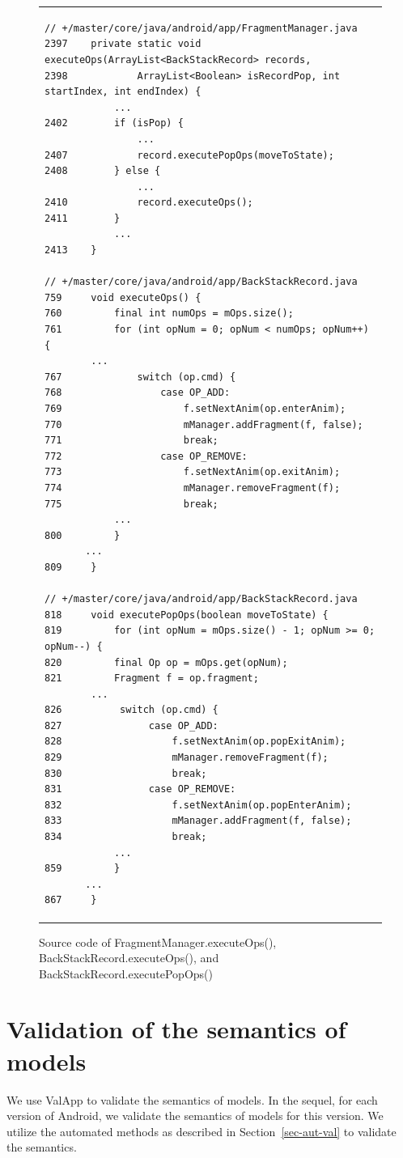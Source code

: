 \begin{figure}[H]
\centering
\begin{tabular*}{\linewidth}{l}
\begin{lstlisting}
// +/master/core/java/android/app/FragmentManager.java
2397    private static void executeOps(ArrayList<BackStackRecord> records,
2398            ArrayList<Boolean> isRecordPop, int startIndex, int endIndex) {
            ...
2402        if (isPop) {
                ...
2407            record.executePopOps(moveToState);
2408        } else {
                ...
2410            record.executeOps();
2411        }
            ...
2413    }

// +/master/core/java/android/app/BackStackRecord.java
759     void executeOps() {
760         final int numOps = mOps.size();
761         for (int opNum = 0; opNum < numOps; opNum++) {
		...
767             switch (op.cmd) {
768                 case OP_ADD:
769                     f.setNextAnim(op.enterAnim);
770                     mManager.addFragment(f, false);
771                     break;
772                 case OP_REMOVE:
773                     f.setNextAnim(op.exitAnim);
774                     mManager.removeFragment(f);
775                     break;
	    	...
800	    	}
	   ...
809     }

// +/master/core/java/android/app/BackStackRecord.java
818     void executePopOps(boolean moveToState) {
819         for (int opNum = mOps.size() - 1; opNum >= 0; opNum--) {
820         final Op op = mOps.get(opNum);
821         Fragment f = op.fragment;
		...
826          switch (op.cmd) {
827               case OP_ADD:
828                   f.setNextAnim(op.popExitAnim);
829                   mManager.removeFragment(f);
830                   break;
831               case OP_REMOVE:
832                   f.setNextAnim(op.popEnterAnim);
833                   mManager.addFragment(f, false);
834                   break;
	    	...
859	        }
	   ...
867     }
\end{lstlisting}
\end{tabular*}
\caption{Source code of FragmentManager.executeOps(), BackStackRecord.executeOps(), and BackStackRecord.executePopOps()}\label{code-executeOps}
\end{figure}

\section{Validation of the semantics of {\AMASS} models}\label{app-sem-val-amass}
%
We use ValApp to validate the semantics of {\AMASS} models. In the sequel, for each version of Android, we validate the semantics of {\AMASS} models for this version. 
We utilize the automated methods as described in Section~\ref{sec-aut-val} to validate the semantics. 

